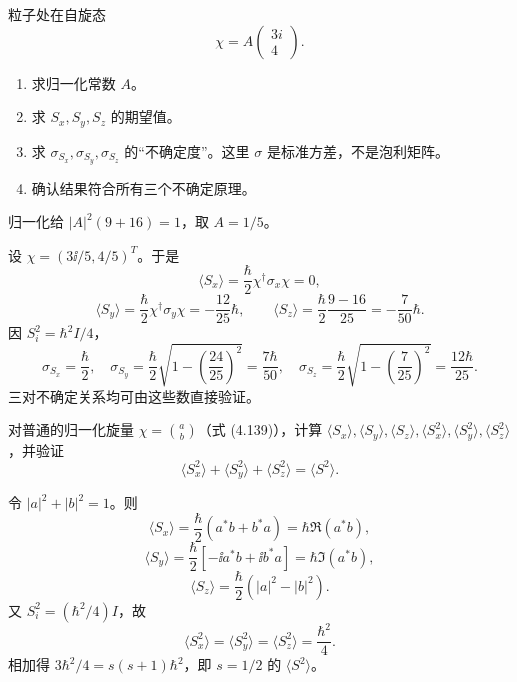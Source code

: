 \begin{question}
粒子处在自旋态
\[
\chi=A\begin{pmatrix}3i\\4\end{pmatrix}.
\]
\begin{enumerate}
\item 求归一化常数 $A$。
\item 求 $S_x,S_y,S_z$ 的期望值。
\item 求 $\sigma_{S_x},\sigma_{S_y},\sigma_{S_z}$ 的“不确定度”。这里 $\sigma$ 是标准方差，不是泡利矩阵。
\item 确认结果符合所有三个不确定原理。
\end{enumerate}
\end{question}
\begin{solution}

归一化给 $|A|^2(9+16)=1$，取 $A=1/5$。

设 $\chi=(3\ii/5,4/5)^T$。于是
\[
\langle S_x\rangle=\frac\hbar2\chi^\dagger\sigma_x\chi=0,
\]
\[
\langle S_y\rangle=\frac\hbar2\chi^\dagger\sigma_y\chi=-\frac{12}{25}\hbar,
\qquad
\langle S_z\rangle=\frac\hbar2\frac{9-16}{25}=-\frac{7}{50}\hbar.
\]
因 $S_i^2=\hbar^2I/4$，
\[
\sigma_{S_x}=\frac\hbar2,
\quad
\sigma_{S_y}=\frac\hbar2\sqrt{1-\left(\frac{24}{25}\right)^2}=\frac{7\hbar}{50},
\quad
\sigma_{S_z}=\frac\hbar2\sqrt{1-\left(\frac{7}{25}\right)^2}=\frac{12\hbar}{25}.
\]
三对不确定关系均可由这些数直接验证。

\end{solution}

\begin{question}
对普通的归一化旋量 $\chi=\binom{a}{b}$（式 (4.139)），计算 $\langle S_x\rangle,\langle S_y\rangle,\langle S_z\rangle,\langle S_x^2\rangle,\langle S_y^2\rangle,\langle S_z^2\rangle$，并验证
\[
\langle S_x^2\rangle+\langle S_y^2\rangle+\langle S_z^2\rangle=\langle S^2\rangle.
\]

\par\smallskip
{}

\end{question}
\begin{solution}

令 $|a|^2+|b|^2=1$。则
\[
\langle S_x\rangle=\frac\hbar2(a^*b+b^*a)=\hbar\Re(a^*b),
\]
\[
\langle S_y\rangle=\frac\hbar2[-\ii a^*b+\ii b^*a]=\hbar\Im(a^*b),
\]
\[
\langle S_z\rangle=\frac\hbar2(|a|^2-|b|^2).
\]
又 $S_i^2=(\hbar^2/4)I$，故
\[
\langle S_x^2\rangle=\langle S_y^2\rangle=\langle S_z^2\rangle=\frac{\hbar^2}{4}.
\]
相加得 $3\hbar^2/4=s(s+1)\hbar^2$，即 $s=1/2$ 的 $\langle S^2\rangle$。

\end{solution}

